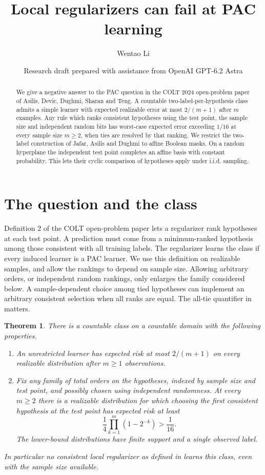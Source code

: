 \documentclass[11pt]{article}
\title{Local regularizers can fail at PAC learning}
\author{Wentao Li}
\date{Research draft prepared with assistance from OpenAI GPT-6.2 Astra}
\newtheorem{theorem}{Theorem}
\begin{document}
\maketitle
\begin{abstract}
We give a negative answer to the PAC question in the COLT 2024 open-problem paper of Asilis, Devic, Dughmi, Sharan and Teng. A countable two-label-per-hypothesis class admits a simple learner with expected realizable error at most $2/(m+1)$ after $m$ examples. Any rule which ranks consistent hypotheses using the test point, the sample size and independent random bits has worst-case expected error exceeding $1/16$ at every sample size $m\ge2$, when ties are resolved by that ranking. We restrict the two-label construction of Jafar, Asilis and Dughmi to affine Boolean masks. On a random hyperplane the independent test point completes an affine basis with constant probability. This lets their cyclic comparison of hypotheses apply under i.i.d. sampling.
\end{abstract}

\section{The question and the class}
Definition 2 of the COLT open-problem paper \cite{open} lets a regularizer rank hypotheses at each test point. A prediction must come from a minimum-ranked hypothesis among those consistent with all training labels. The regularizer learns the class if every induced learner is a PAC learner. We use this definition on realizable samples, and allow the rankings to depend on sample size. Allowing arbitrary orders, or independent random rankings, only enlarges the family considered below. A sample-dependent choice among tied hypotheses can implement an arbitrary consistent selection when all ranks are equal. The all-tie quantifier in \cite{open} matters.

\begin{theorem}\label{thm}
There is a countable class on a countable domain with the following properties.
\begin{enumerate}
\item An unrestricted learner has expected risk at most $2/(m+1)$ on every realizable distribution after $m\ge1$ observations.
\item Fix any family of total orders on the hypotheses, indexed by sample size and test point, and possibly chosen using independent randomness. At every $m\ge2$ there is a realizable distribution for which choosing the first consistent hypothesis at the test point has expected risk at least
\[
 \frac{1}{4}\prod_{k=1}^{m}(1-2^{-k})>\frac1{16}.
\]
The lower-bound distributions have finite support and a single observed label.
\end{enumerate}
In particular no consistent local regularizer as defined in \cite{open} learns this class, even with the sample size available.
\end{theorem}
\end{document}
